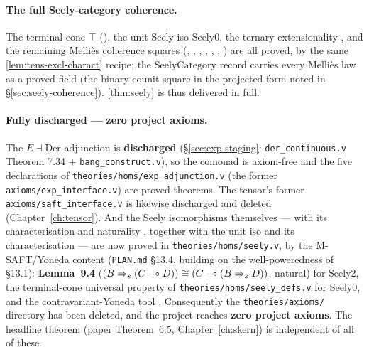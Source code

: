\paragraph{The full Seely-category coherence.}
The terminal cone $\top$ (),
the unit Seely iso $\mathrm{Seely0}$, the ternary extensionality
, and the remaining
Melli\`es coherence squares (,
,
,
,
,
,
) are all proved, by the same
\autoref{lem:tens-excl-charact} recipe; the
$\mathrm{SeelyCategory}$ record carries every Melli\`es law as a proved
field (the binary counit square in the projected form noted in
\S\ref{sec:seely-coherence}). \autoref{thm:seely} is thus delivered in
full.

\paragraph{Fully discharged --- zero project axioms.}
The $E \dashv \mathrm{Der}$ adjunction is \textbf{discharged}
(\S\ref{sec:exp-staging}: \texttt{der\_continuous.v} Theorem 7.34 +
\texttt{bang\_construct.v}), so the comonad is axiom-free and the five
declarations of \texttt{theories/homs/exp\_adjunction.v} (the former
\texttt{axioms/exp\_interface.v}) are proved theorems. The tensor's
former \texttt{axioms/saft\_interface.v} is likewise discharged and
deleted (Chapter~\ref{ch:tensor}). And the Seely isomorphisms themselves
---  with its characterisation
 and naturality
, together with the
unit iso  and its
characterisation  --- are now proved
in \texttt{theories/homs/seely.v}, by the M-SAFT/Yoneda content
(\texttt{PLAN.md} \S13.4, building on the well-poweredness of \S13.1):
\textbf{Lemma~9.4} 
($(B \Rightarrow_s (C \multimap D)) \cong (C \multimap (B \Rightarrow_s D))$,
natural) for $\mathrm{Seely2}$, the terminal-cone universal property of
\texttt{theories/homs/seely\_defs.v} for $\mathrm{Seely0}$, and the
contravariant-Yoneda tool
. Consequently the
\texttt{theories/axioms/} directory has been deleted, and the project
reaches \textbf{zero project axioms}. The headline theorem (paper
Theorem~6.5, Chapter~\ref{ch:skern}) is independent of all of these.

